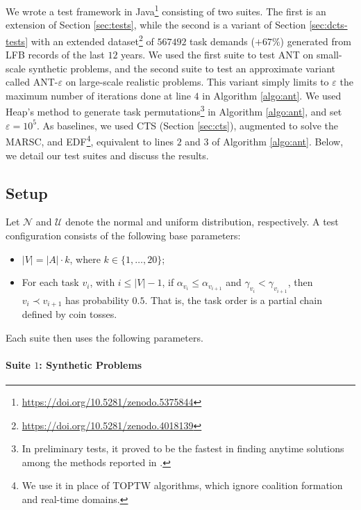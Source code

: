 We wrote a test framework in Java\footnote{\url{https://doi.org/10.5281/zenodo.5375844}}
consisting of two suites. The first is an extension of Section \ref{sec:tests}, while the
second is a variant of Section \ref{sec:dcts-tests} with an extended
dataset\footnote{\url{https://doi.org/10.5281/zenodo.4018139}} of $567492$ task demands
($+67\%$) generated from LFB records of the last $12$ years. We used the first suite to
test ANT on small-scale synthetic problems, and the second suite to test an approximate
variant called ANT-$\varepsilon$ on large-scale realistic problems. This variant simply
limits to $\varepsilon$ the maximum number of iterations done at line $4$ in Algorithm
\ref{algo:ant}. We used Heap's method \cite{sedgewick1977} to generate task
permutations\footnote{In preliminary tests, it proved to be the fastest in finding anytime
solutions among the methods reported in \cite{sedgewick1977}.} in Algorithm
\ref{algo:ant}, and set $\varepsilon = 10^5$. As baselines, we used CTS (Section
\ref{sec:cts}), augmented to solve the MARSC, and EDF\footnote{We use it in place of TOPTW
algorithms, which ignore coalition formation and real-time domains.}, equivalent to lines
$2$ and $3$ of Algorithm \ref{algo:ant}. Below, we detail our test suites and discuss the
results.
\clearpage

\subsection{Setup}

Let $\mathcal{N}$ and $\mathcal{U}$ denote the normal and uniform distribution,
respectively. A test configuration consists of the following base parameters:

\begin{itemize}
    \item $|V| = |A| \cdot k$, where $k \in \{ 1, \dots, 20 \}$;
    \item For each task $v_i$, with $i \leq |V| - 1$, if $\alpha_{v_i} \leq
        \alpha_{v_{i+1}}$ and $\gamma_{v_i} < \gamma_{v_{i+1}}$, then $v_i \prec v_{i+1}$
        has probability $0.5$. That is, the task order is a partial chain defined by coin
        tosses.
\end{itemize}
Each suite then uses the following parameters.

\paragraph{Suite $1$: Synthetic Problems}

